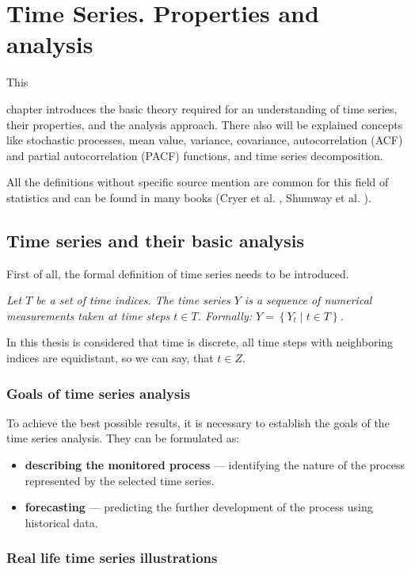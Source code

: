\chapter{Time Series. Properties and analysis}

\hypertarget{ch2}{This} chapter introduces the basic theory required for an understanding of time series, their properties, and the analysis approach. There also will be explained concepts like stochastic processes, mean value, variance, covariance, autocorrelation (ACF) and partial autocorrelation (PACF) functions, and time series decomposition. 

All the definitions without specific source mention are common for this field of statistics and can be found in many books (Cryer et al. \cite{cryer2008time}, Shumway et al. \cite{shumway2011}). 

\section{Time series and their basic analysis}
First of all, the formal definition of time series needs to be introduced. 
\begin{definition}
\textit{Let $T$ be a set of time indices. The time series $Y$ is a sequence of numerical measurements taken at time steps $t \in T$. Formally: $Y = \left\{Y_{t}\;|\;t \in T\right\}$.
}
\end{definition}

In this thesis is considered that time is discrete, all time steps with neighboring indices are equidistant, so we can say, that $t \in Z$. 

\subsection{Goals of time series analysis}

To achieve the best possible results, it is necessary to establish the goals of the time series analysis. They can be formulated as:

\begin{itemize}
    \item \textbf{describing the monitored process} --- identifying the nature of the process represented by the selected time series.
    \item \textbf{forecasting} --- predicting the further development of the process using historical data.
\end{itemize}
\subsection{Real life time series illustrations}

